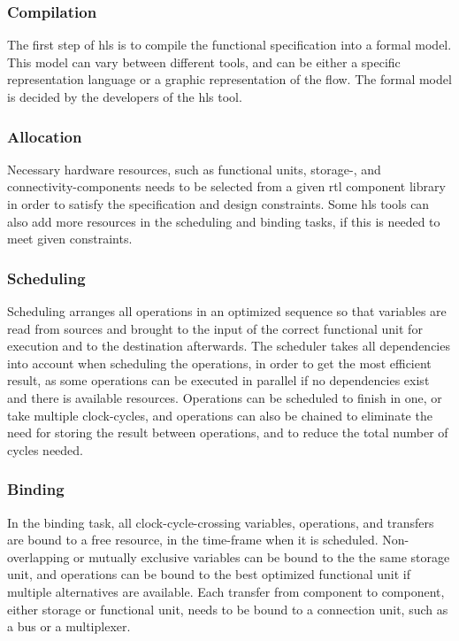 \subsubsection{Compilation}

The first step of \gls{hls} is to compile the functional specification into a formal model. This model can vary between different tools, and can be either a specific representation language or a graphic representation of the flow. The formal model is decided by the developers of the \gls{hls} tool. 

\subsubsection{Allocation}

Necessary hardware resources, such as functional units, storage-, and connectivity-components needs to be selected from a given \gls{rtl} component library in order to satisfy the specification and design constraints. Some \gls{hls} tools can also add more resources in the scheduling and binding tasks, if this is needed to meet given constraints.

\subsubsection{Scheduling}
Scheduling arranges all operations in an optimized sequence so that variables are read from sources and brought to the input of the correct functional unit for execution and to the destination afterwards. The scheduler takes all dependencies into account when scheduling the operations, in order to get the most efficient result, as some operations can be executed in parallel if no dependencies exist and there is available resources. Operations can be scheduled to finish in one, or take multiple clock-cycles, and operations can also be chained to eliminate the need for storing the result between operations, and to reduce the total number of cycles needed. 
\subsubsection{Binding}
In the binding task, all clock-cycle-crossing variables, operations, and transfers are bound to a free resource, in the time-frame when it is scheduled. Non-overlapping or mutually exclusive variables can be bound to the the same storage unit, and operations can be bound to the best optimized functional unit if multiple alternatives are available. Each transfer from component to component, either storage or functional unit, needs to be bound to a connection unit, such as a bus or a multiplexer.
